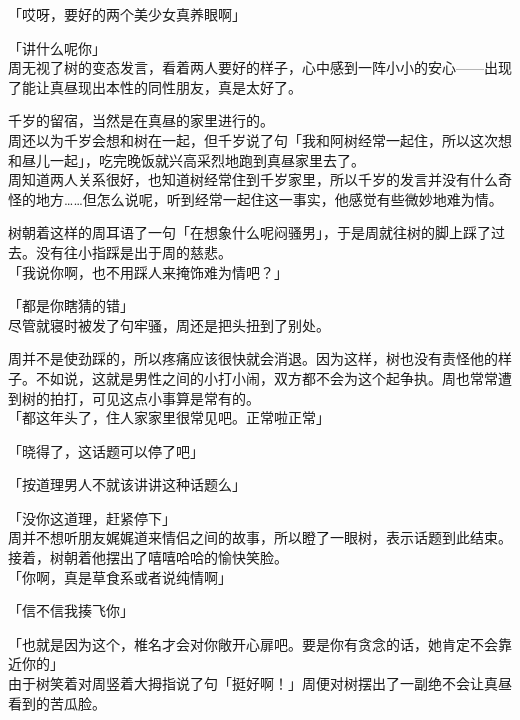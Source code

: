 「哎呀，要好的两个美少女真养眼啊」

「讲什么呢你」\\

周无视了树的变态发言，看着两人要好的样子，心中感到一阵小小的安心——出现了能让真昼现出本性的同性朋友，真是太好了。\\

\vspace{2\baselineskip}

千岁的留宿，当然是在真昼的家里进行的。\\

周还以为千岁会想和树在一起，但千岁说了句「我和阿树经常一起住，所以这次想和昼儿一起」，吃完晚饭就兴高采烈地跑到真昼家里去了。\\

周知道两人关系很好，也知道树经常住到千岁家里，所以千岁的发言并没有什么奇怪的地方……但怎么说呢，听到经常一起住这一事实，他感觉有些微妙地难为情。

树朝着这样的周耳语了一句「在想象什么呢闷骚男」，于是周就往树的脚上踩了过去。没有往小指踩是出于周的慈悲。\\

「我说你啊，也不用踩人来掩饰难为情吧？」

「都是你瞎猜的错」\\

尽管就寝时被发了句牢骚，周还是把头扭到了别处。

周并不是使劲踩的，所以疼痛应该很快就会消退。因为这样，树也没有责怪他的样子。不如说，这就是男性之间的小打小闹，双方都不会为这个起争执。周也常常遭到树的拍打，可见这点小事算是常有的。\\

「都这年头了，住人家家里很常见吧。正常啦正常」

「晓得了，这话题可以停了吧」

「按道理男人不就该讲讲这种话题么」

「没你这道理，赶紧停下」\\

周并不想听朋友娓娓道来情侣之间的故事，所以瞪了一眼树，表示话题到此结束。接着，树朝着他摆出了嘻嘻哈哈的愉快笑脸。\\

「你啊，真是草食系或者说纯情啊」

「信不信我揍飞你」

「也就是因为这个，椎名才会对你敞开心扉吧。要是你有贪念的话，她肯定不会靠近你的」\\

由于树笑着对周竖着大拇指说了句「挺好啊！」周便对树摆出了一副绝不会让真昼看到的苦瓜脸。


